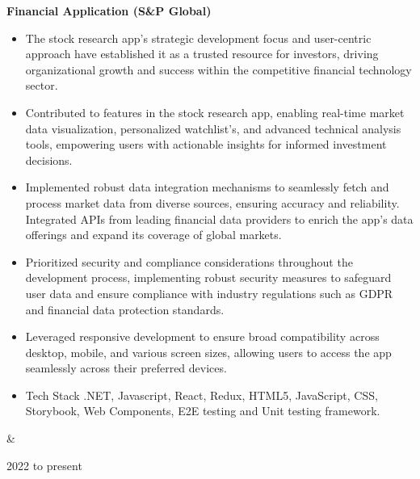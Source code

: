 \documentclass[10pt, letterpaper]{article}
\newenvironment{highlights}{
        \begin{itemize}[
                topsep=0pt,
                parsep=0.10 cm,
                partopsep=0pt,
                itemsep=0pt,
                after=\vspace{-1\baselineskip},
                leftmargin=0.4 cm + 3pt
            ]
    }{
        \end{itemize}
    } %
\let\originalTabularx\tabularx
\let\originalEndTabularx\endtabularx
\renewenvironment{tabularx}{\bgroup\centering\originalTabularx}{\originalEndTabularx\par\egroup}
\begin{document}
        \begin{tabularx}{
            \textwidth-0.4 cm-0.13cm
        }{
            K{0.2 cm}
            R{4.1 cm}
        }
            \textbf{Financial Application (S\&P Global)}

            \vspace{0.10 cm}

            \begin{highlights}
                \item The stock research app's strategic development focus and user-centric approach have established it as a trusted resource for investors, driving organizational growth and success within the competitive financial technology sector.
                \item Contributed to features in the stock research app, enabling real-time market data visualization, personalized watchlist's, and advanced technical analysis tools, empowering users with actionable insights for informed investment decisions.
                \item Implemented robust data integration mechanisms to seamlessly fetch and process market data from diverse sources, ensuring accuracy and reliability. Integrated APIs from leading financial data providers to enrich the app's data offerings and expand its coverage of global markets.
                \item Prioritized security and compliance considerations throughout the development process, implementing robust security measures to safeguard user data and ensure compliance with industry regulations such as GDPR and financial data protection standards.
                \item Leveraged responsive development to ensure broad compatibility across desktop, mobile, and various screen sizes, allowing users to access the app seamlessly across their preferred devices.
                \item Tech Stack .NET, Javascript, React, Redux, HTML5, JavaScript, CSS, Storybook, Web Components, E2E testing and Unit testing framework.
            \end{highlights}
            &
            

            2022 to present
        \end{tabularx}
\end{document}

